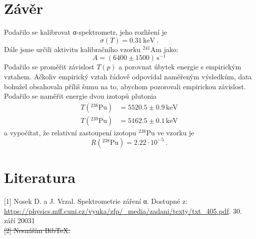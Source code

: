 \documentclass[10pt,a4paper]{article}
\renewcommand{\U}[1]{\ensuremath{\,\mathrm{#1}}}
\newcommand{\°}{\degree}
\begin{document}
\section{Závěr}
Podařilo se kalibrovat α-spektrometr, jeho rozlišení je
\begin{equation*}
    \sigma(T) = 0.31 \U{keV} \: .
\end{equation*}
Dále jsme určili aktivitu kalibračního vzorku $^{241}$Am jako:
\begin{equation*}
    A = (6400 \pm 1500) \U{s^{-1}}
\end{equation*}
Podařilo se proměřit závislost $T(p)$ a porovnat úbytek energie s empirickým vztahem. Ačkoliv empirický vztah řádově odpovídal naměřeným výsledkům, data bohužel obsahovala příliš šumu na to, abychom pozorovali empirickou závislost.
\\
Podařilo se naměřit energie dvou izotopů plutonia
\begin{align*}
    T({}^{238}\text{Pu}) &= 5520.5 \pm 0.9 \U{keV} \\
    T({}^{239}\text{Pu}) &= 5162.5 \pm 0.1 \U{keV}
\end{align*}
a vypočítat, že relativní zastoupení izotopu $^{238}$Pu ve vzorku je
\begin{equation*}
    R({}^{238}\text{Pu})
    = 2.22 \cdot 10^{-5} \: .
\end{equation*}


\section{Literatura}
[1] Nosek D. a J. Vrzal. Spektrometrie záření α. Dostupné z: \url{https://physics.mff.cuni.cz/vyuka/zfp/_media/zadani/texty/txt_405.pdf}. 30. září 20031
\\
\st{[2] Nesnáším BibTeX.}
\end{document}

